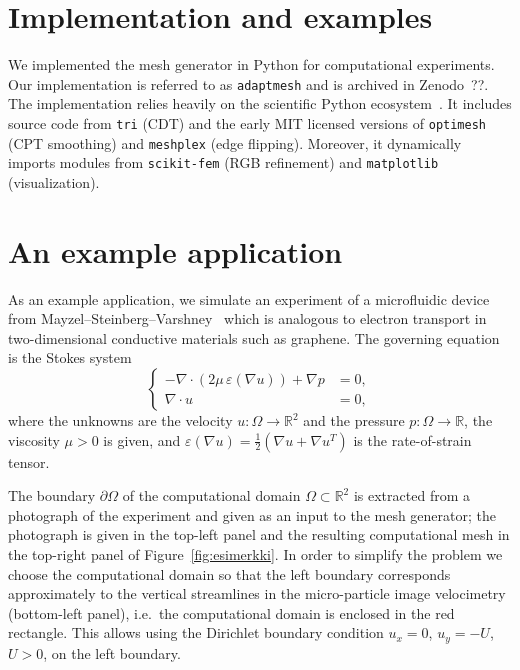 \documentclass[11pt]{article}
\begin{document}

\section{Implementation and examples}

We implemented the mesh generator in Python for computational experiments.  Our
implementation is referred to as \verb|adaptmesh| and is archived in Zenodo~??.
The implementation relies heavily on the scientific Python
ecosystem~\cite{virtanen2020scipy}.  It includes source code from \verb|tri| \cite{tri}
(CDT) and the early MIT licensed versions of \verb|optimesh| \cite{optimesh} (CPT
smoothing) and \verb|meshplex| \cite{meshplex} (edge flipping).  Moreover, it
dynamically imports modules from \verb|scikit-fem| \cite{gustafsson2020scikit} (RGB
refinement) and \verb|matplotlib| \cite{hunter2007matplotlib} (visualization).

\section{An example application}

As an example application, we simulate an experiment of a
microfluidic device from
Mayzel--Steinberg--Varshney~\cite{mayzel2019stokes}
which is analogous to electron transport in two-dimensional
conductive materials such as graphene.
The governing equation is the Stokes system
\begin{equation}
  \left\{
  \begin{aligned}
    -\nabla \cdot (2\mu\,\varepsilon(\nabla u)) + \nabla p &= 0, \\
    \nabla \cdot u &= 0,
  \end{aligned}
  \right.
\end{equation}
where the unknowns are the velocity $u : \Omega \rightarrow \mathbb{R}^2$ and
the pressure $p : \Omega \rightarrow \mathbb{R}$, the viscosity $\mu > 0$ is
given, and $\varepsilon(\nabla u) = \tfrac12(\nabla u + \nabla u^T)$ is the
rate-of-strain tensor.

The boundary $\partial \Omega$ of the computational domain $\Omega \subset
\mathbb{R}^2$ is extracted from a photograph of the experiment and given as an
input to the mesh generator; the photograph is given in the top-left panel and
the resulting computational mesh in the top-right panel of
Figure~\ref{fig:esimerkki}.  In order to simplify the problem we choose the
computational domain so that the left boundary corresponds approximately to the
vertical streamlines in the micro-particle image velocimetry (bottom-left
panel), i.e.~the computational domain is enclosed in the red rectangle.  This
allows using the Dirichlet boundary condition $u_x = 0$, $u_y = -U$, $U > 0$, on
the left boundary.
\end{document}
